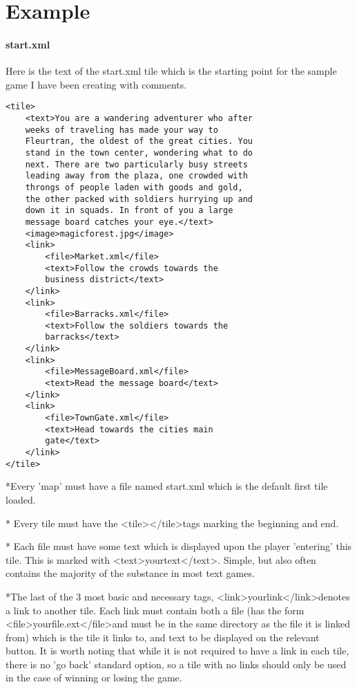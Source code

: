 \documentclass[11pt]{article}
\begin{document}
\section{Example}

\paragraph{start.xml}

Here is the text of the start.xml tile which is the starting point for the sample game I have been creating with comments.

\begin{lstlisting}[frame=single]
<tile>
	<text>You are a wandering adventurer who after 
	weeks of traveling has made your way to 
	Fleurtran, the oldest of the great cities. You 
	stand in the town center, wondering what to do 
	next. There are two particularly busy streets 
	leading away from the plaza, one crowded with 
	throngs of people laden with goods and gold, 
	the other packed with soldiers hurrying up and 
	down it in squads. In front of you a large 
	message board catches your eye.</text>
	<image>magicforest.jpg</image>
	<link>
		<file>Market.xml</file>
		<text>Follow the crowds towards the 
		business district</text>
	</link>
	<link>
		<file>Barracks.xml</file>
		<text>Follow the soldiers towards the 
		barracks</text>
	</link>
	<link>
		<file>MessageBoard.xml</file>
		<text>Read the message board</text>
	</link>
	<link>
		<file>TownGate.xml</file>
		<text>Head towards the cities main 
		gate</text>
	</link>
</tile>
\end{lstlisting}
*Every 'map' must have a file named start.xml which is the default first tile loaded.

* Every tile must have the \textless tile\textgreater \textless /tile\textgreater tags marking the beginning and end.

* Each file must have some text which is displayed upon the player 'entering' this tile. This is marked with \textless text\textgreater yourtext\textless /text\textgreater . Simple, but also often contains the majority of the substance in most text games.

*The last of the 3 most basic and necessary tags, \textless link\textgreater yourlink\textless /link\textgreater  denotes a link to another tile. Each link must contain both a file (has the form \textless file\textgreater yourfile.ext\textless /file\textgreater and must be in the same directory as the file it is linked from) which is the tile it links to, and text to be displayed on the relevant button. It is worth noting that while it is not required to have a link in each tile, there is no 'go back' standard option, so a tile with no links should only be used in the case of winning or losing the game.
\end{document}
